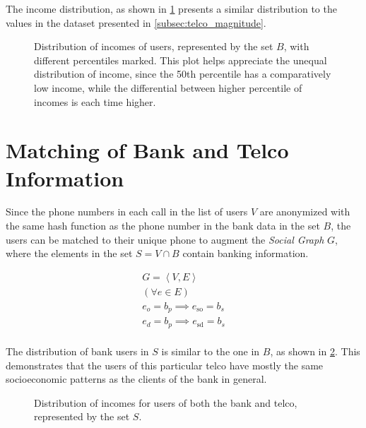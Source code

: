 The income distribution, as shown in \cref{fig:incomedistribution} presents a similar distribution to the values in the dataset presented in \cref{subsec:telco_magnitude}.

\begin{figure}
\centering
{}
\caption{Distribution of incomes of users, represented by the set $B$, with different percentiles marked. This plot helps appreciate the unequal distribution of income, since the 50th percentile has a comparatively low income, while the differential between higher percentile of incomes is each time higher.}
\label{fig:incomedistribution}
\end{figure}

\section{Matching of Bank and Telco Information}
\label{subsec:banktencomathing}

Since the phone numbers in each call in the list of users $V$ are anonymized with the same hash function as the phone number in the bank data in the set $B$, the users can be matched to their unique phone to augment the \emph{Social Graph} $G$, where the elements in the set $S = V \cap B$ contain banking information.

\begin{equation}
\label{eq:banktelcojoin}
\begin{gathered}
G = \left< V, E \right> \\
( \forall e \in E ) \\
e_o = b_p \implies e_{\operatorname{so}} = b_s \\
e_d = b_p \implies e_{\operatorname{sd}} = b_s \\
\end{gathered}
\end{equation}

The distribution of bank users in $S$ is similar to the one in $B$, as shown in \cref{fig:matchdistribution}. This demonstrates that the users of this particular telco have mostly the same socioeconomic patterns as the clients of the bank in general.

\begin{figure}
\centering
{}
\caption{Distribution of incomes for users of both the bank and telco, represented by the set $S$.}
\label{fig:matchdistribution}
\end{figure}

